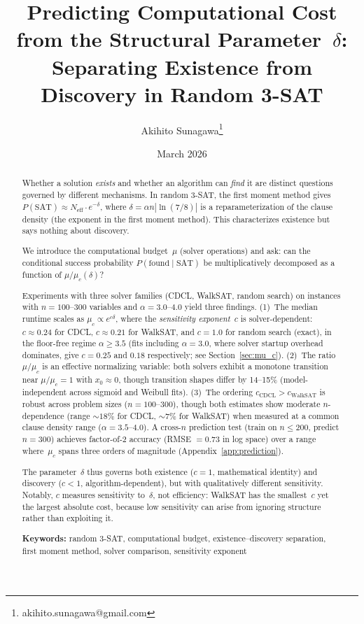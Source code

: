 \documentclass[11pt,a4paper]{article}
\title{Predicting Computational Cost from the Structural Parameter~$\delta$:\\
Separating Existence from Discovery in Random 3-SAT}
\author{Akihito Sunagawa\thanks{akihito.sunagawa@gmail.com}}
\date{March 2026}
\newcommand{\mc}{\mu_c}
\newcommand{\Neff}{N_{\text{eff}}}
\newcommand{\PSAT}{P(\text{SAT})}
\newcommand{\PfSAT}{P(\text{found}\mid\text{SAT})}
\begin{document}
\maketitle

\begin{abstract}
Whether a solution \emph{exists} and whether an algorithm can \emph{find} it are
distinct questions governed by different mechanisms.
In random 3-SAT, the first moment method gives
$\PSAT \approx \Neff \cdot e^{-\delta}$,
where $\delta = \alpha n |\!\ln(7/8)|$ is a reparameterization
of the clause density (the exponent in the first moment method).
This characterizes existence but says nothing about discovery.

We introduce the computational budget~$\mu$ (solver operations) and ask:
can the conditional success probability $\PfSAT$ be
multiplicatively decomposed as a function of $\mu / \mc(\delta)$?

Experiments with three solver families (CDCL, WalkSAT, random search)
on instances with $n = 100$--$300$ variables and $\alpha = 3.0$--$4.0$
yield three findings.
(1)~The median runtime scales as $\mc \propto e^{c\delta}$, where the
\emph{sensitivity exponent}~$c$ is solver-dependent:
$c \approx 0.24$ for CDCL,
$c \approx 0.21$ for WalkSAT, and
$c = 1.0$ for random search (exact),
in the floor-free regime $\alpha \geq 3.5$
(fits including $\alpha = 3.0$, where solver startup
overhead dominates, give $c = 0.25$ and $0.18$ respectively;
see Section~\ref{sec:mu_c}).
(2)~The ratio $\mu/\mc$ is an effective normalizing variable:
both solvers exhibit a monotone transition near $\mu/\mc = 1$
with $x_0 \approx 0$, though transition shapes differ by 14--15\%
(model-independent across sigmoid and Weibull fits).
(3)~The ordering $c_{\text{CDCL}} > c_{\text{WalkSAT}}$ is robust
across problem sizes ($n = 100$--$300$), though both estimates
show moderate $n$-dependence (range ${\sim}18\%$ for CDCL,
${\sim}7\%$ for WalkSAT) when measured at a common clause density
range ($\alpha = 3.5$--$4.0$).
A cross-$n$ prediction test (train on $n \leq 200$,
predict $n = 300$) achieves factor-of-2 accuracy
(RMSE $= 0.73$ in log space) over a range where~$\mc$
spans three orders of magnitude
(Appendix~\ref{app:prediction}).

The parameter~$\delta$ thus governs both existence ($c=1$, mathematical identity)
and discovery ($c < 1$, algorithm-dependent), but with qualitatively different
sensitivity.
Notably, $c$ measures sensitivity to~$\delta$, not efficiency:
WalkSAT has the smallest~$c$ yet the largest absolute cost,
because low sensitivity can arise from ignoring structure
rather than exploiting it.

\medskip
\noindent\textbf{Keywords:} random 3-SAT, computational budget,
existence--discovery separation, first moment method,
solver comparison, sensitivity exponent
\end{abstract}
\end{document}

